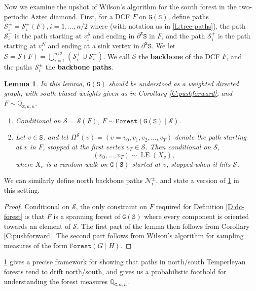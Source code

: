 \documentclass[11pt,twoside]{amsart}
\theoremstyle{plain}
\newtheorem{lem}[thm]{Lemma}
\numberwithin{quest}{section}
\theoremstyle{remark}
\numberwithin{rem}{section}
\theoremstyle{definition}
\newcommand{\Q}{\mathbb{Q}}
\newcommand{\cS}{\mathcal{S}}
\newcommand{\cN}{\mathcal{N}}
\renewcommand{\tt}[1]{{\mathtt{#1}}}
\begin{document}
	Now we examine the upshot of Wilson's algorithm for the south forest in the two-periodic Aztec diamond. First, for a DCF $F$ on $\tt{G}(\tt{S})$, define paths 
	$
	\cS_i^\pm = \cS_i^\pm(F), i = 1, \dots, n/2
	$
	where (with notation as in \cref{L:tree-paths}), the path $\cS_i^-$ is the path starting at $v_i^S$ and ending in $\partial^\tt{x} \tt{S}$ in $F$, and the path $\cS_i^+$ is the path starting at $v_i^N$ and ending at a sink vertex in $\partial^\tt{x} \tt{S}$. We let $\cS = \cS(F) = \bigcup_{i =1}^{n/2} (\cS_i^+ \cup \cS_i^-)$. We call $\cS$ the \textbf{backbone} of the DCF $F$, and the paths $\cS_i^\pm$ the \textbf{backbone paths}.
	
		
	
	\begin{lem}
		\label{L:simple-sample}
		In this lemma, $\tt{G}(\tt{S})$ should be understood as a weighted directed graph, with south-biased weights given as in Corollary \ref{C:pushforward}, and $F \sim \Q_{\tt{S}, a, n}$.
		\begin{enumerate}[label=\arabic*.]
			\item Conditional on $\cS = \cS(F)$, $F \sim \tt{Forest}(\tt{G}(\tt{S}) \mid \cS)$.
			\item Let $v \in \tt{S}$, and let $\Pi^\cS(v) = (v = v_0, v_1, v_2, \dots, v_T)$ denote the path starting at $v$ in $F$, stopped at the first vertex $v_T \in \cS$. Then conditional on $\cS$, 
			$$
			(v_0, \dots, v_T) \sim \operatorname{LE}(X_v),
			$$
			where $X_v$ is a random walk on $\tt{G}(\tt{S})$ started at $v$, stopped when it hits $\cS$.
		\end{enumerate} 
	\end{lem}
	We can similarly define north backbone paths $\cN_i^\pm$, and state a version of \cref{L:simple-sample} in this setting.
	
	\begin{proof}
		Conditional on $\cS$, the only constraint on $F$ required for Definition \ref{D:dc-forest} is that $F$ is a spanning forest of $\tt{G}(\tt{S})$ where every component is oriented towards an element of $\cS$. The first part of the lemma then follows from Corollary \ref{C:pushforward}. The second part follows from Wilson's algorithm for sampling measures of the form $\tt{Forest}(G \mid H)$.
	\end{proof}
	
	\cref{L:simple-sample} gives a precise framework for showing that paths in north/south Temperleyan forests tend to drift north/south, and gives us a probabilistic foothold for understanding the forest measures $\Q_{\tt{C}, a, n}$.
	
\end{document}
